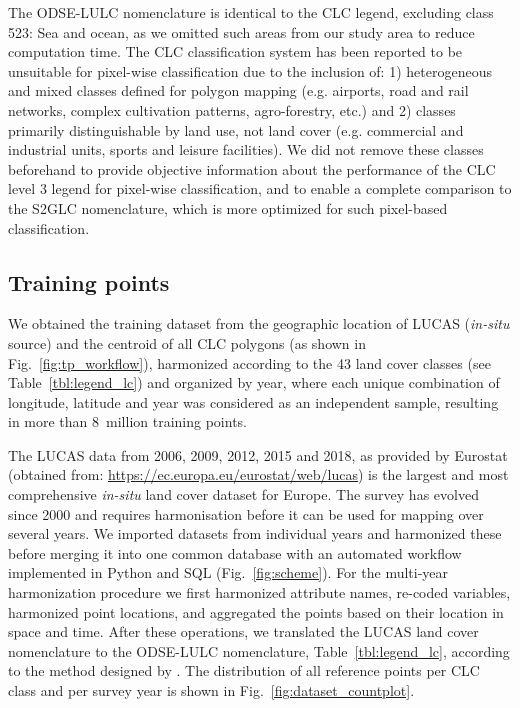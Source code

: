    The  ODSE-LULC nomenclature is identical to the CLC legend, excluding class 523: Sea and ocean, as we omitted such areas from our study area to reduce computation time. The CLC classification system has been reported to be unsuitable for pixel-wise classification due to the inclusion of: 1) heterogeneous and mixed classes defined for polygon mapping (e.g. airports, road and rail networks, complex cultivation patterns, agro-forestry, etc.) and 2) classes primarily distinguishable by land use, not land cover (e.g. commercial and industrial units, sports and leisure facilities). We did not remove these classes beforehand to provide objective information about the performance of the CLC level 3 legend for pixel-wise classification, and to enable a complete comparison to the S2GLC nomenclature, which is more optimized for such pixel-based classification.

\subsection*{Training points}

    We obtained the training dataset from the geographic location of LUCAS (\emph{in-situ} source) and the centroid of all CLC polygons (as shown in Fig.\@~\ref{fig:tp_workflow}), harmonized according to the 43 land cover classes (see Table\@~\ref{tbl:legend_lc}) and organized by year, where each unique combination of longitude, latitude and year was considered as an independent sample, resulting in more than 8~million training points.
    
    
    
    The LUCAS data from 2006, 2009, 2012, 2015 and 2018, as provided by Eurostat (obtained from: \url{https://ec.europa.eu/eurostat/web/lucas}) is the largest and most comprehensive \emph{in-situ} land cover dataset for Europe. The survey has evolved since 2000 and requires harmonisation before it can be used for mapping over several years. We imported datasets from individual years and harmonized these before merging it into one common database with an automated workflow implemented in Python and SQL (Fig.\@~\ref{fig:scheme}). For the multi-year harmonization procedure we first harmonized attribute names, re-coded variables, harmonized point locations, and aggregated the points based on their location in space and time. After these operations, we translated the LUCAS land cover nomenclature to the  ODSE-LULC nomenclature, Table\@~\ref{tbl:legend_lc}, according to the method designed by \citet{buck}. The distribution of all reference points per CLC class and per survey year is shown in Fig.\@~\ref{fig:dataset_countplot}.
    

